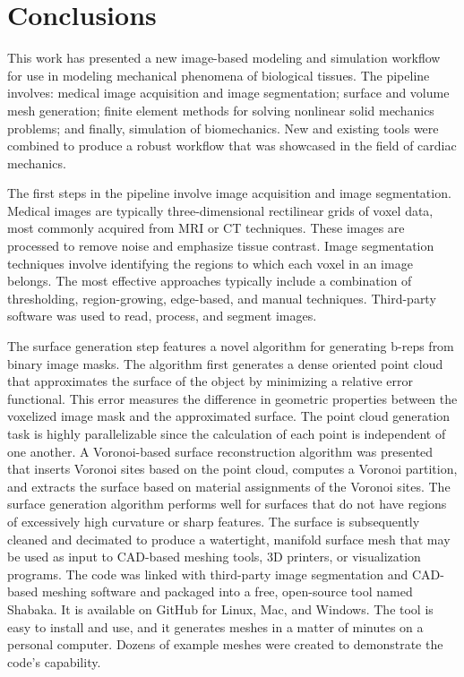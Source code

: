 \chapter{Conclusions}
\label{chap:7}
%

This work has presented a new image-based modeling and simulation workflow for use in modeling mechanical phenomena of biological tissues. The pipeline involves: medical image acquisition and image segmentation; surface and volume mesh generation; finite element methods for solving nonlinear solid mechanics problems; and finally, simulation of biomechanics. New and existing tools were combined to produce a robust workflow that was showcased in the field of cardiac mechanics.

The first steps in the pipeline involve image acquisition and image segmentation. Medical images are typically three-dimensional rectilinear grids of voxel data, most commonly acquired from MRI or CT techniques. These images are processed to remove noise and emphasize tissue contrast. Image segmentation techniques involve identifying the regions to which each voxel in an image belongs. The most effective approaches typically include a combination of thresholding, region-growing, edge-based, and manual techniques. Third-party software was used to read, process, and segment images.

The surface generation step features a novel algorithm for generating b-reps from binary image masks. The algorithm first generates a dense oriented point cloud that approximates the surface of the object by minimizing a relative error functional. This error measures the difference in geometric properties between the voxelized image mask and the approximated surface. The point cloud generation task is highly parallelizable since the calculation of each point is independent of one another. A Voronoi-based surface reconstruction algorithm was presented that inserts Voronoi sites based on the point cloud, computes a Voronoi partition, and extracts the surface based on material assignments of the Voronoi sites. The surface generation algorithm performs well for surfaces that do not have regions of excessively high curvature or sharp features. The surface is subsequently cleaned and decimated to produce a watertight, manifold surface mesh that may be used as input to CAD-based meshing tools, 3D printers, or visualization programs. The code was linked with third-party image segmentation and CAD-based meshing software and packaged into a free, open-source tool named Shabaka. It is available on GitHub for Linux, Mac, and Windows. The tool is easy to install and use, and it generates meshes in a matter of minutes on a personal computer. Dozens of example meshes were created to demonstrate the code's capability.

